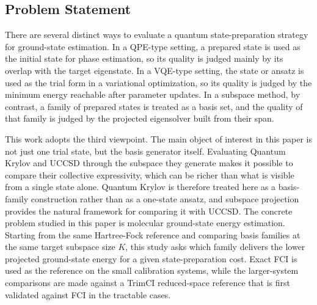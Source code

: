 \subsection{Problem Statement}

There are several distinct ways to evaluate a quantum state-preparation strategy for ground-state estimation. In a QPE-type setting, a prepared state is used as the initial state for phase estimation, so its quality is judged mainly by its overlap with the target eigenstate. In a VQE-type setting, the state or ansatz is used as the trial form in a variational optimization, so its quality is judged by the minimum energy reachable after parameter updates. In a subspace method, by contrast, a family of prepared states is treated as a basis set, and the quality of that family is judged by the projected eigensolver built from their span.

This work adopts the third viewpoint. The main object of interest in this paper is not just one trial state, but the basis generator itself. Evaluating Quantum Krylov and UCCSD through the subspace they generate makes it possible to compare their collective expressivity, which can be richer than what is visible from a single state alone. Quantum Krylov is therefore treated here as a basis-family construction rather than as a one-state ansatz, and subspace projection provides the natural framework for comparing it with UCCSD. The concrete problem studied in this paper is molecular ground-state energy estimation. Starting from the same Hartree-Fock reference and comparing basis families at the same target subspace size $K$, this study asks which family delivers the lower projected ground-state energy for a given state-preparation cost. Exact FCI is used as the reference on the small calibration systems, while the larger-system comparisons are made against a TrimCI reduced-space reference that is first validated against FCI in the tractable cases.
